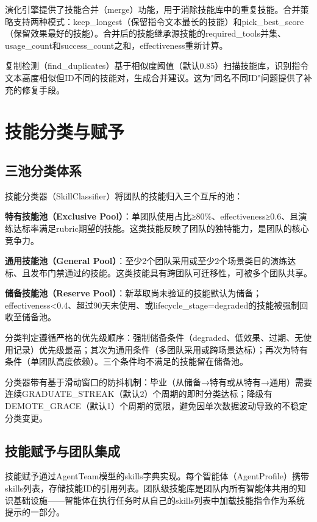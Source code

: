 \documentclass[conference]{IEEEtran}
\begin{document}
演化引擎提供了技能合并（merge）功能，用于消除技能库中的重复技能。合并策略支持两种模式：keep\_longest（保留指令文本最长的技能）和pick\_best\_score（保留效果最好的技能）。合并后的技能继承源技能的required\_tools并集、usage\_count和success\_count之和，effectiveness重新计算。

复制检测（find\_duplicates）基于相似度阈值（默认0.85）扫描技能库，识别指令文本高度相似但ID不同的技能对，生成合并建议。这为"同名不同ID"问题提供了补充的修复手段。

\section{技能分类与赋予}

\subsection{三池分类体系}

技能分类器（SkillClassifier）将团队的技能归入三个互斥的池：

\textbf{特有技能池（Exclusive Pool）}：单团队使用占比≥80\%、effectiveness≥0.6、且演练达标率满足rubric期望的技能。这类技能反映了团队的独特能力，是团队的核心竞争力。

\textbf{通用技能池（General Pool）}：至少2个团队采用或至少2个场景类目的演练达标、且发布门禁通过的技能。这类技能具有跨团队可迁移性，可被多个团队共享。

\textbf{储备技能池（Reserve Pool）}：新萃取尚未验证的技能默认为储备；effectiveness<0.4、超过90天未使用、或lifecycle\_stage=degraded的技能被强制回收至储备池。

分类判定遵循严格的优先级顺序：强制储备条件（degraded、低效果、过期、无使用记录）优先级最高；其次为通用条件（多团队采用或跨场景达标）；再次为特有条件（单团队高度依赖）。三个条件均不满足的技能留在储备池。

分类器带有基于滑动窗口的防抖机制：毕业（从储备→特有或从特有→通用）需要连续GRADUATE\_STREAK（默认2）个周期的即时分类达标；降级有DEMOTE\_GRACE（默认1）个周期的宽限，避免因单次数据波动导致的不稳定分类变更。

\subsection{技能赋予与团队集成}

技能赋予通过AgentTeam模型的skills字典实现。每个智能体（AgentProfile）携带skills列表，存储技能ID的引用列表。团队级技能库是团队内所有智能体共用的知识基础设施——智能体在执行任务时从自己的skills列表中加载技能指令作为系统提示的一部分。
\end{document}

